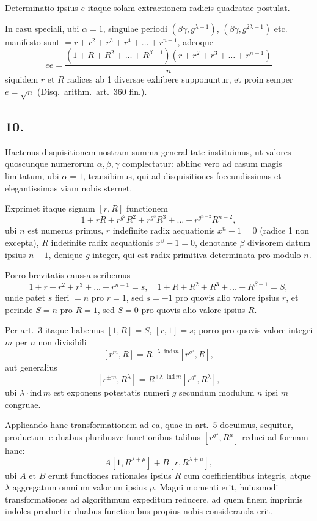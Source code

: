 \documentclass[12pt,a4paper]{article}
\begin{document}
Determinatio ipsius $e$ itaque solam extractionem radicis quadratae postulat.

In casu speciali, ubi $\alpha=1$, singulae periodi $(\beta\gamma, g^{\lambda-1})$, $(\beta\gamma, g^{2\lambda-1})$ etc. manifesto sunt $= r + r^2 + r^3 + r^4 + \ldots + r^{n-1}$, adeoque
\[
ee = \frac{(1+R+R^2+\ldots+R^{\beta-1})(r+r^2+r^3+\ldots+r^{n-1})}{n}
\]
siquidem $r$ et $R$ radices ab 1 diversae exhibere supponuntur, et proin semper $e = \sqrt{n}$ (Disq.\ arithm.\ art.\ 360 fin.).

\subsection*{10.}

Hactenus disquisitionem nostram summa generalitate instituimus, ut valores quoscunque numerorum $\alpha, \beta, \gamma$ complectatur: abhinc vero ad casum magis limitatum, ubi $\alpha=1$, transibimus, qui ad disquisitiones foecundissimas et elegantissimas viam nobis sternet.

Exprimet itaque signum $[r,R]$ functionem
\[
1 + rR + r^{g^2}R^2 + r^{g^3}R^3 + \ldots + r^{g^{n-2}}R^{n-2},
\]
ubi $n$ est numerus primus, $r$ indefinite radix aequationis $x^n-1=0$ (radice 1 non excepta), $R$ indefinite radix aequationis $x^\beta-1=0$, denotante $\beta$ divisorem datum ipsius $n-1$, denique $g$ integer, qui est radix primitiva determinata pro modulo $n$.

Porro brevitatis caussa scribemus
\[
1 + r + r^2 + r^3 + \ldots + r^{n-1} = s, \quad 1 + R + R^2 + R^3 + \ldots + R^{\beta-1} = S,
\]
unde patet $s$ fieri $=n$ pro $r=1$, sed $s=-1$ pro quovis alio valore ipsius $r$, et perinde $S=n$ pro $R=1$, sed $S=0$ pro quovis alio valore ipsius $R$.

Per art.\ 3 itaque habemus $[1,R] = S$, $[r,1] = s$; porro pro quovis valore integri $m$ per $n$ non divisibili
\[
[r^m, R] = R^{-\lambda\cdot\text{ind}\,m}[r^{g^\nu}, R],
\]
aut generalius
\[
[r^{\pm m}, R^\lambda] = R^{\mp\lambda\cdot\text{ind}\,m}[r^{g^\nu}, R^\lambda],
\]
ubi $\lambda\cdot\text{ind}\,m$ est exponens potestatis numeri $g$ secundum modulum $n$ ipsi $m$ congruae.

Applicando hanc transformationem ad ea, quae in art.\ 5 docuimus, sequitur, productum e duabus pluribusve functionibus talibus $[r^{g^\lambda}, R^\mu]$ reduci ad formam hanc:
\[
A[1, R^{\lambda+\mu}] + B[r, R^{\lambda+\mu}],
\]
ubi $A$ et $B$ erunt functiones rationales ipsius $R$ cum coefficientibus integris, atque $\lambda$ aggregatum omnium valorum ipsius $\mu$. Magni momenti erit, huiusmodi transformationes ad algorithmum expeditum reducere, ad quem finem imprimis indoles producti e duabus functionibus propius nobis consideranda erit.
\end{document}
